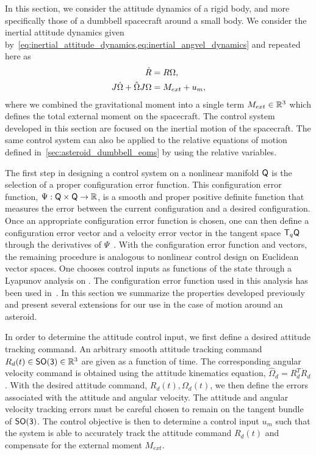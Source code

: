 In this section, we consider the attitude dynamics of a rigid body, and more specifically those of a dumbbell spacecraft around a small body. 
We consider the inertial attitude dynamics given by~\cref{eq:inertial_attitude_dynamics,eq:inertial_angvel_dynamics} and repeated here as
\begin{align*}
    \dot{R} &= R \Omega, \\
    J \dot{\Omega} + \hat{\Omega} J \Omega &= M_{ext} + u_m,
\end{align*}
where we combined the gravitational moment into a single term \( M_{ext} \in \mathbb{R}^3 \) which defines the total external moment on the spacecraft.
The control system developed in this section are focused on the inertial motion of the spacecraft.
The same control system can also be applied to the relative equations of motion defined in~\cref{sec:asteroid_dumbbell_eoms} by using the relative variables.

The first step in designing a control system on a nonlinear manifold \( \mathsf{Q} \) is the selection of a proper configuration error function. 
This configuration error function, \( \Psi : \mathsf{Q} \times \mathsf{Q} \to \mathbb{R} \), is a smooth and proper positive definite function that measures the error between the current configuration and a desired configuration. 
Once an appropriate configuration error function is chosen, one can then define a configuration error vector and a velocity error vector in the tangent space \( \mathsf{T}_q \mathsf{Q} \) through the derivatives of \( \Psi \)~\cite{bullo2004}. 
With the configuration error function and vectors, the remaining procedure is analogous to nonlinear control design on Euclidean vector spaces. 
One chooses control inputs as functions of the state through a Lyapunov analysis on \Q.
The configuration error function used in this analysis has been used in~\cite{bullo2004,chaturvedi2009,lee2011a,kulumani2017a}.
In this section we summarize the properties developed previously and present several extensions for our use in the case of motion around an asteroid.

In order to determine the attitude control input, we first define a desired attitude tracking command.
An arbitrary smooth attitude tracking command \( R_d (t) \in \mathsf{SO(3)} \in \mathbb{R}^3 \) are given as a function of time.
The corresponding angular velocity command is obtained using the attitude kinematics equation, \( \hat{\Omega}_d = R_d^T \dot{R}_d \).
With the desired attitude command, \( R_d(t), \Omega_d(t) \), we then define the errors associated with the attitude and angular velocity.
The attitude and angular velocity tracking errors must be careful chosen to remain on the tangent bundle of \(\mathsf{SO(3)}\).
The control objective is then to determine a control input \( u_m \) such that the system is able to accurately track the attitude command \( R_d(t) \) and compensate for the external moment \( M_{ext} \).

